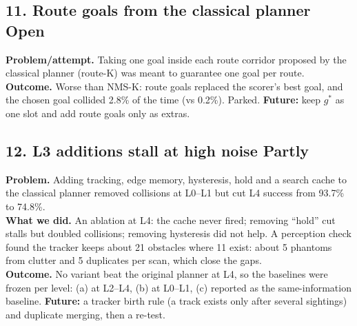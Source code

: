 \documentclass[11pt,a4paper]{article}
\newcommand{\partly}{\textcolor{accent}{\textbf{Partly}}}
\newcommand{\open}{\textcolor{warn}{\textbf{Open}}}
\begin{document}
\subsection*{11. Route goals from the classical planner \hfill\open}
\textbf{Problem/attempt.} Taking one goal inside each route corridor proposed by the classical planner (route-K)
was meant to guarantee one goal per route.\\
\textbf{Outcome.} Worse than NMS-K: route goals replaced the scorer's best goal, and the chosen goal collided
2.8\% of the time (vs 0.2\%). Parked. \textbf{Future:} keep $g^*$ as one slot and add route goals only as extras.

\subsection*{12. L3 additions stall at high noise \hfill\partly}
\textbf{Problem.} Adding tracking, edge memory, hysteresis, hold and a search cache to the classical planner
removed collisions at L0--L1 but cut L4 success from 93.7\% to 74.8\%.\\
\textbf{What we did.} An ablation at L4: the cache never fired; removing ``hold'' cut stalls but doubled
collisions; removing hysteresis did not help. A perception check found the tracker keeps about 21 obstacles
where 11 exist: about 5 phantoms from clutter and 5 duplicates per scan, which close the gaps.\\
\textbf{Outcome.} No variant beat the original planner at L4, so the baselines were frozen per level: (a) at
L2--L4, (b) at L0--L1, (c) reported as the same-information baseline. \textbf{Future:} a tracker birth rule (a
track exists only after several sightings) and duplicate merging, then a re-test.
\end{document}
